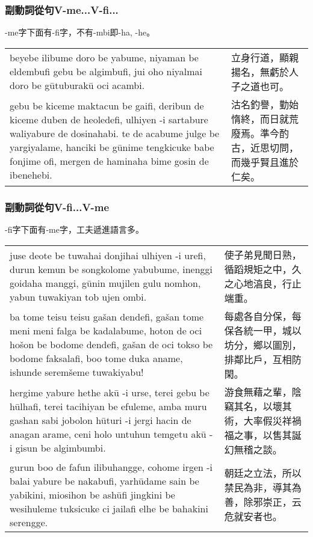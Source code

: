\documentclass{article}
\begin{document}
\subsubsection{副動詞從句V-me...V-fi...}
\noindent -me字下面有-fi字，不有-mbi即-ha, -he。
\begin{center}
    \begin{tabularx}{\textwidth}{XX}
        beyebe ilibume doro be yabume, niyaman be eldembufi gebu be algimbufi, jui oho niyalmai doro be g\={u}tuburak\={u} oci acambi.& 立身行道，顯親揚名，無虧於人子之道也可。\\
        gebu be kiceme maktacun be gaifi, deribun de kiceme duben de heoledefi, ulhiyen -i sartabure waliyabure de dosinahabi. te de acabume julge be yargiyalame, hanciki be g\={u}nime tengkicuke babe fonjime ofi, mergen de haminaha bime gosin de ibenehebi. & 沽名釣譽，勤始惰終，而日就荒廢焉。準今酌古，近思切問，而幾乎賢且進於仁矣。
    \end{tabularx}
\end{center}

\subsubsection{副動詞從句V-fi...V-me}
\noindent -fi字下面有-me字，工夫遞進語言多。
\begin{center}
    \begin{tabularx}{\textwidth}{XX}
        juse deote be tuwahai donjihai ulhiyen -i urefi, durun kemun be songkolome yabubume, inenggi goidaha manggi, g\={u}nin mujilen gulu nomhon, yabun tuwakiyan tob ujen ombi.& 使子弟見聞日熟，循蹈規矩之中，久之心地湻良，行止端重。\\
        ba tome teisu teisu ga\v{s}an dendefi, ga\v{s}an tome meni meni falga be kadalabume, hoton de oci ho\v{s}on be bodome dendefi, ga\v{s}an de oci tokso be bodome faksalafi, boo tome duka aname, ishunde serem\v{s}eme tuwakiyabu! & 每處各自分保，每保各統一甲，城以坊分，鄉以圖別，排鄰比戶，互相防閑。\\
        hergime yabure hethe ak\={u} -i urse, terei gebu be h\={u}lhafi, terei tacihiyan be efuleme, amba muru gashan sabi jobolon h\={u}turi -i jergi hacin de anagan arame, ceni holo untuhun temgetu ak\={u} -i gisun be algimbumbi. & 游食無藉之輩，陰竊其名，以壞其術，大率假災祥禍福之事，以售其誕幻無稽之談。\\
        gurun boo de fafun ilibuhangge, cohome irgen -i balai yabure be nakabufi, yarh\={u}dame sain be yabikini, miosihon be ash\={u}fi jingkini be wesihuleme tuksicuke ci jailafi elhe be bahakini serengge. & 朝廷之立法，所以禁民為非，導其為善，除邪崇正，云危就安者也。
    \end{tabularx}
\end{center}
\end{document}
